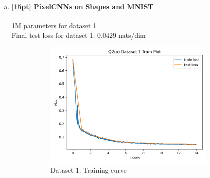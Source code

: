 \documentclass{article}
\begin{document}
\newpage
{}

\begin{enumerate}[(a)]
\item {\bf [15pt] PixelCNNs on Shapes and MNIST} \\\\
1M parameters for dataset 1 \\
Final test loss for dataset 1: 0.0429 nats/dim
\begin{figure}[H]
    \centering
    \begin{subfigure}{0.45\textwidth}
        \centering
        \includegraphics[width=\textwidth]{figures/q2_a_dset1_train_plot.png}
        \caption{Dataset 1: Training curve}
    \end{subfigure}
    \hspace{0.2in}
    \begin{subfigure}{0.45\textwidth}
        \centering

\end{subfigure}
\end{figure}
\end{enumerate}
\end{document}
